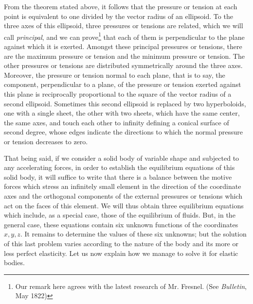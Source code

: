 \documentclass[leqno,openright,smallroyalvopaper,8pt,twoside,showtrims]{memoir}
\begin{document}
From the theorem stated above, it follows that the pressure or tension at each point is equivalent to one divided by the vector radius of an ellipsoid. To the three axes of this ellipsoid, three pressures or tensions are related, which we will call \emph{principal}, and we can prove\footnote{Our remark here agrees with the latest research of Mr. Fresnel. (See \emph{Bulletin}, May 1822)} that each of them is perpendicular to the plane against which it is exerted. Amongst these principal pressures or tensions, there are the maximum pressure or tension and the minimum pressure or tension. The other pressures or tensions are distributed symmetrically around the three axes. Moreover, the pressure or tension normal to each plane, that is to say, the component, perpendicular to a plane, of the pressure or tension exerted against this plane is reciprocally proportional to the square of the vector radius of a second ellipsoid. Sometimes this second ellipsoid is replaced by two hyperboloids, one with a single sheet, the other with two sheets, which have the same center, the same axes, and touch each other to infinity defining a conical surface of second degree, whose edges indicate the directions to which the normal pressure or tension decreases to zero. 

That being said, if we consider a solid body of variable shape and subjected to any accelerating forces, in order to establish the equilibrium equations of this solid body, it will suffice to write that there is a balance between the motive forces which stress an infinitely small element in the direction of the coordinate axes and the orthogonal components of the external pressures or tensions which act on the faces of this element. We will thus obtain three equilibrium equations which include, as a special case, those of the equilibrium of fluids. But, in the general case, these equations contain six unknown functions of the coordinates $x, y, z$. It remains to determine the values of these six unknowns; but the solution of this last problem varies according to the nature of the body and its more or less perfect elasticity. Let us now explain how we manage to solve it for elastic bodies. 
\end{document}
